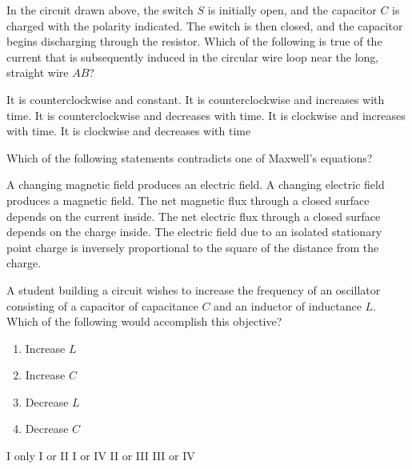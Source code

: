 \documentclass[12pt]{../oss-classkick-exam}
\begin{document}
\begin{questions}
  \question In the circuit drawn above, the switch $S$ is initially open, and
  the capacitor $C$ is charged with the polarity indicated. The switch is then
  closed, and the capacitor begins discharging through the resistor. Which of
  the following is true of the current that is subsequently induced in the
  circular wire loop near the long, straight wire $AB$?

  \begin{choices}
    \choice It is counterclockwise and constant.
    \choice It is counterclockwise and increases with time.
    \choice It is counterclockwise and decreases with time.
    \choice It is clockwise and increases with time.
    \choice It is clockwise and decreases with time
  \end{choices}
  \vspace{.3in}
  
  \uplevel{\rule{\linewidth}{.5pt}}
  
  \question Which of the following statements contradicts one of Maxwell's
  equations?
  \begin{choices}
    \choice A changing magnetic field produces an electric field.
    \choice A changing electric field produces a magnetic field.
    \choice The net magnetic flux through a closed surface depends on the
    current inside.
    \choice The net electric flux through a closed surface depends on the
    charge inside.
    \choice The electric field due to an isolated stationary point charge is
    inversely proportional to the square of the distance from the charge.
  \end{choices}
  \vspace{.7in}
  \newpage
  
  
  \question A student building a circuit wishes to increase the frequency of an
  oscillator consisting of a capacitor of capacitance $C$ and an inductor of
  inductance $L$. Which of the following would accomplish this objective?
  \begin{enumerate}[nosep,label={\Roman*.}]
  \item Increase $L$
  \item Increase $C$
  \item Decrease $L$
  \item Decrease $C$
  \end{enumerate}
  \vspace{.2in}
  \begin{choices}
    \choice I only
    \choice I or II
    \choice I or IV
    \choice II or III
    \choice III or IV
  \end{choices}
\end{questions}
\end{document}
